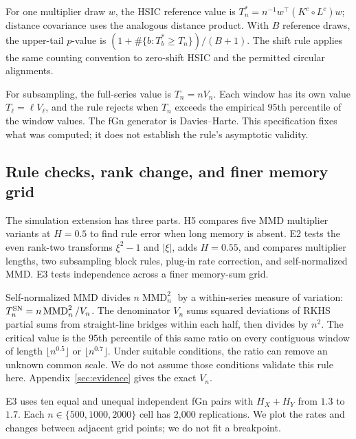 \documentclass[11pt]{article}
\theoremstyle{remark}
\newcommand{\MMD}{\operatorname{MMD}}
\begin{document}
For one multiplier draw $w$, the HSIC reference value is $T_n^*=n^{-1}w^\top(K^c\circ L^c)w$; distance covariance uses the analogous distance product. With $B$ reference draws, the upper-tail $p$-value is $(1+\#\{b:T_b^*\geq T_n\})/(B+1)$. The shift rule applies the same counting convention to zero-shift HSIC and the permitted circular alignments.

For subsampling, the full-series value is $T_n=nV_n$. Each window has its own value $T_{\ell}=\ell V_{\ell}$, and the rule rejects when $T_n$ exceeds the empirical $95$th percentile of the window values. The fGn generator is Davies--Harte. This specification fixes what was computed; it does not establish the rule's asymptotic validity.

\subsection{Rule checks, rank change, and finer memory grid}
The simulation extension has three parts. H5 compares five MMD multiplier variants at $H=0.5$ to find rule error when long memory is absent. E2 tests the even rank-two transforms $\xi^2-1$ and $|\xi|$, adds $H=0.55$, and compares multiplier lengths, two subsampling block rules, plug-in rate correction, and self-normalized MMD. E3 tests independence across a finer memory-sum grid.

Self-normalized MMD divides $n\MMD_n^2$ by a within-series measure of variation: $T_n^{\rm SN}=n\MMD_n^2/V_n$. The denominator $V_n$ sums squared deviations of RKHS partial sums from straight-line bridges within each half, then divides by $n^2$. The critical value is the $95$th percentile of this same ratio on every contiguous window of length $\lfloor n^{0.5}\rfloor$ or $\lfloor n^{0.7}\rfloor$. Under suitable conditions, the ratio can remove an unknown common scale. We do not assume those conditions validate this rule here. Appendix~\ref{sec:evidence} gives the exact $V_n$.

E3 uses ten equal and unequal independent fGn pairs with $H_X+H_Y$ from $1.3$ to $1.7$. Each $n\in\{500,1000,2000\}$ cell has 2,000 replications. We plot the rates and changes between adjacent grid points; we do not fit a breakpoint.
\end{document}
